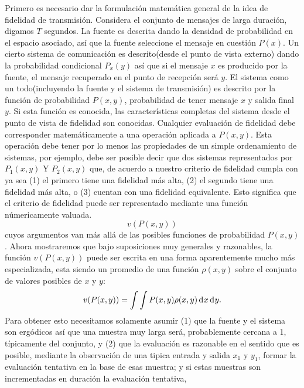 Primero es necesario dar la formulaci\'on matem\'atica general de la
idea de fidelidad de transmisi\'on. Considera el conjunto de mensajes
de larga duraci\'on, digamos $T$ segundos. La fuente es descrita dando
la densidad de probabilidad en el espacio asociado, as\'i que la
fuente seleccione el mensaje en cuesti\'on $P(x)$. Un cierto sistema
de comunicaci\'on es descrito(desde el punto de vista externo) dando
la probabilidad condicional $P_{x}(y)$ as\'i que si el mensaje $x$ es
producido por la fuente, el mensaje recuperado en el punto de
recepci\'on ser\'a $y$. El sistema como un todo(incluyendo la fuente y
el sistema de transmisi\'on) es descrito por la funci\'on de
probabilidad $P(x, y)$, probabilidad de tener mensaje $x$ y salida
final $y$. Si esta funci\'on es conocida, las caracter\'isticas
completas del sistema desde el punto de vista de fidelidad son
conocidas. Cualquier evaluaci\'on de fidelidad debe corresponder
matem\'aticamente a una operaci\'on aplicada a $P(x, y)$. Esta
operaci\'on debe tener por lo menos las propiedades de un simple
ordenamiento de sistemas, por ejemplo, debe ser posible decir que dos
sistemas representados por $P_{1}(x, y)$ Y $P_{2}(x, y)$ que, de
acuerdo a nuestro criterio de fidelidad cumpla con ya sea (1) el
primero tiene una fidelidad m\'as alta, (2) el segundo tiene una
fidelidad m\'as alta, o (3) cuentan con una fidelidad
equivalente. Esto significa que el criterio de fidelidad puede ser
representado mediante una funci\'on n\'umericamente valuada.
\begin{equation} v(P(x,y)) \end{equation}
cuyos argumentos van m\'as all\'a de las posibles funciones de
probabilidad $P(x,y)$.  Ahora mostraremos que bajo suposiciones muy
generales y razonables, la funci\'on $v(P(x,y))$ puede ser escrita en
una forma aparentemente mucho m\'as especializada, esta siendo un
promedio de una funci\'on $\rho(x,y)$ sobre el conjunto de valores
posibles de $x$ y $y$:
\begin{equation} 
v(P(x,y)) = \int \int P(x,y) \rho(x,y) \diff x   \diff y . 
\end{equation}
Para obtener esto necesitamos solamente asumir (1) que la fuente y el
sistema son erg\'odicos as\'i que una muestra muy larga ser\'a,
probablemente cercana a 1, t\'ipicamente del conjunto, y (2) que la
evaluaci\'on es razonable en el sentido que es posible, mediante la
observaci\'on de una tipica entrada y salida $x_{1}$ y $y_{1}$, formar
la evaluaci\'on tentativa en la base de esas muestra; y si estas
muestras son incrementadas en duraci\'on la evaluaci\'on tentativa,
